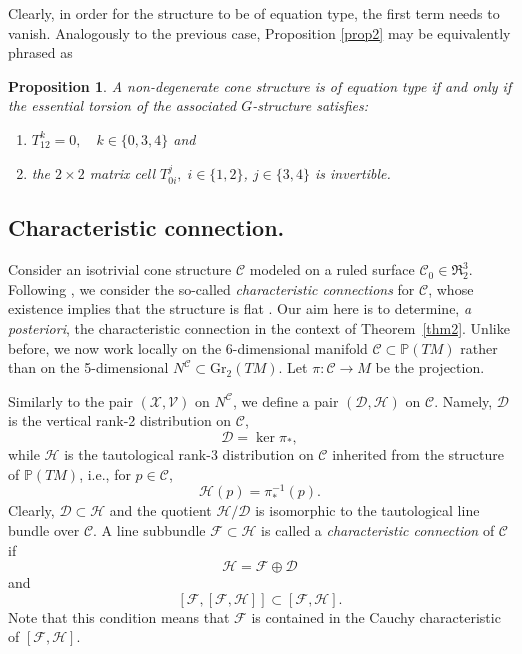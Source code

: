 \documentclass[11pt]{amsart}
\newtheorem{proposition}[theorem]{Proposition}
\theoremstyle{definition}
\newcommand{\PP}{\mathbb{P}}
\newcommand{\DD}{\mathcal{D}}
\newcommand{\VV}{\mathcal{V}}
\newcommand{\FF}{\mathcal{F}}
\newcommand{\XX}{\mathcal{X}}
\newcommand{\HHH}{\mathcal{H}}
\newcommand{\CC}{\mathcal{C}}
\begin{document}
Clearly, in order for the structure to be of equation type, the first term needs to vanish. Analogously to the previous case, Proposition \ref{prop2} may be equivalently phrased as
\begin{proposition}
 A non-degenerate cone structure is of equation type if and only if the essential torsion of the associated $G$-structure satisfies:
\begin{enumerate}
\item $T^k_{12}=0, \quad k\in\{0,3,4\}$ and
\item the $2\times 2$ matrix cell $T^j_{0i},\; i\in \{1,2\}$, $j\in\{3,4\}$ is invertible.
\end{enumerate}
\end{proposition}


\subsection{Characteristic connection.}\label{sec:char_con}
Consider an isotrivial cone structure $\CC$ modeled on a ruled surface $\CC_0 \in \mathfrak{R}^3_2$. Following \cite{H0}, we consider the so-called \emph{characteristic connections} for $\CC$, whose existence implies that the structure is flat \cite[Theorem 5.8]{H0}. Our aim here is to determine, \emph{a posteriori}, the characteristic connection in the context of Theorem~\ref{thm2}. Unlike before, we now work locally on the 6-dimensional manifold $\CC \subset \PP(TM)$ rather than on the 5-dimensional $N^\CC \subset \mathrm{Gr}_2(TM)$. Let $\pi \colon \CC \to M$ be the projection.

Similarly to the pair $(\XX,\VV)$ on $N^\CC$, we define a pair $(\DD,\HHH)$ on $\CC$. Namely, $\DD$ is the vertical rank-2 distribution on $\CC$,
\[
\DD = \ker \pi_*,
\]
while $\HHH$ is the tautological rank-3 distribution on $\CC$ inherited from the structure of $\PP(TM)$, i.e., for $p \in \CC$,
\[
\HHH(p) = \pi_*^{-1}(p).
\]
Clearly, $\DD \subset \HHH$ and the quotient $\HHH/\DD$ is isomorphic to the tautological line bundle over $\CC$. A line subbundle $\FF \subset \HHH$ is called a \emph{characteristic connection} of $\CC$ if
\[
\HHH = \FF \oplus \DD
\]
and
\[
[\FF,[\FF,\HHH]] \subset [\FF,\HHH].
\]
Note that this condition means that $\FF$ is contained in the Cauchy characteristic of $[\FF,\HHH]$.
\end{document}

